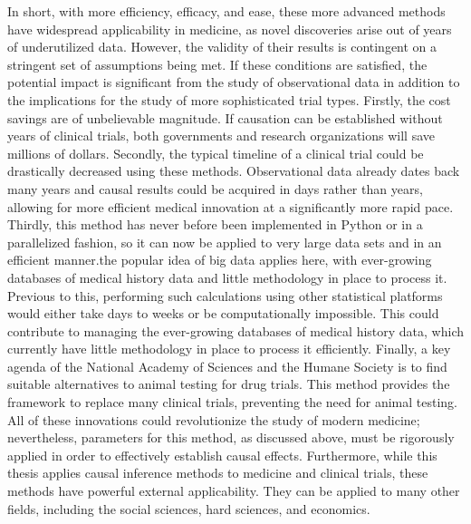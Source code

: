 In short, with more efficiency, efficacy, and ease, these more advanced methods have widespread applicability in medicine, as novel discoveries arise out of years of underutilized data.  However, the validity of their results is contingent on a stringent set of assumptions being met.  If these conditions are satisfied, the potential impact is significant from the study of observational data in addition to the implications for the study of more sophisticated trial types.  Firstly, the cost savings are of unbelievable magnitude.  If causation can be established without years of clinical trials, both governments and research organizations will save millions of dollars.  Secondly, the typical timeline of a clinical trial could be drastically decreased using these methods.  Observational data already dates back many years and causal results could be acquired in days rather than years, allowing for more efficient medical innovation at a significantly more rapid pace.  Thirdly, this method has never before been implemented in Python or in a parallelized fashion, so it can now be applied to very large data sets and in an efficient manner.the popular idea of big data applies here, with ever-growing databases of medical history data and little methodology in place to process it.  Previous to this, performing such calculations using other statistical platforms would either take days to weeks or be computationally impossible. This could contribute to managing the ever-growing databases of medical history data, which currently have little methodology in place to process it efficiently.  Finally, a key agenda of the National Academy of Sciences and the Humane Society is to find suitable alternatives to animal testing for drug trials.\cite{avoidinganimaltesting, dzauvital}   This method provides the framework to replace many clinical trials, preventing the need for animal testing.  All of these innovations could revolutionize the study of modern medicine; nevertheless, parameters for this method, as discussed above, must be rigorously applied in order to effectively establish causal effects.  Furthermore, while this thesis applies causal inference methods to medicine and clinical trials, these methods have powerful external applicability. They can be applied to many other fields, including the social sciences, hard sciences, and economics.  



